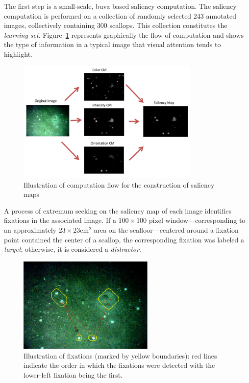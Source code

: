 \documentclass {udthesis}
\begin{document}
The first step is a small-scale, \gls{buva} based saliency computation. 
The saliency computation is performed 
on a collection of randomly selected 243 annotated images, collectively containing 300 scallops.
This collection constitutes the \emph{learning set}.
Figure~\ref{fig:saliency_combine} represents graphically the flow of computation
and shows the type of information in a typical image that visual attention tends to highlight.
%
\begin{figure}
\vskip -5pt
\centering
\includegraphics[width=0.80\textwidth,natwidth=864,natheight=582]{saliency_example1.png}
\caption{Illustration of computation flow for the construction of saliency maps}
\label{fig:saliency_combine}
\end{figure}
%

A process of extremum
seeking on the saliency map of each image identifies fixations in the associated image.
If a $100\times100$ pixel window---corresponding to an approximately $23 \times 23$\enspace cm$^2$ area on the seafloor---centered around a fixation point
contained the center of a scallop, the corresponding 
fixation was labeled a \emph{target}; otherwise, it is considered a \emph{distractor}.

\begin{figure} 
\centering
\includegraphics[width=0.6\textwidth,natwidth=800,natheight=600]{fixation_example.pdf}
\caption[Illustration of fixations]{Illustration of fixations (marked by yellow boundaries):
         red lines indicate the order in which the fixations were detected with the lower-left fixation being the first.
}
\label{fig:fixation}
\end{figure}
\end{document}

